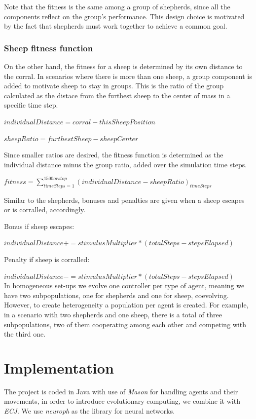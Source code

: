 \documentclass[conference]{IEEEtran}
\begin{document}
Note that the fitness is the same among a group of shepherds, since all the components reflect on the group's performance. This design choice is motivated by the fact that shepherds must work together to achieve a common goal. 

\subsubsection{Sheep fitness function}
On the other hand, the fitness for a sheep is determined by its own distance to the corral. In scenarios where there is more than one sheep, a group component is added to motivate sheep to stay in groups. This is the ratio of the group calculated as the distace from the furthest sheep to the center of mass in a specific time step. 

$\displaystyle individualDistance = corral - thisSheepPosition $

$\displaystyle sheepRatio = furthestSheep - sheepCenter $

Since smaller ratios are desired, the fitness function is determined as the individual distance minus the group ratio, added over the simulation time steps. 

$\displaystyle fitness = \sum_{timeSteps=1}^{1500 or stop}(individualDistance - sheepRatio)_{timeSteps}$

Similar to the shepherds, bonuses and penalties are given when a sheep escapes or is corralled, accordingly.  

Bonus if sheep escapes:

$\displaystyle individualDistance += stimulusMultiplier * (totalSteps - stepsElapsed)$

Penalty if sheep is corralled:

$\displaystyle individualDistance -= stimulusMultiplier * (totalSteps - stepsElapsed)$\\

In homogeneous set-ups we evolve one controller per type of agent, meaning we have two subpopulations, one for shepherds and one for sheep, coevolving. However, to create heterogeneity a population per agent is created. For example, in a scenario with two shepherds and one sheep, there is a total of three subpopulations, two of them cooperating among each other and competing with the third one.  


\section{Implementation}
The project is coded in Java with use of \textit{Mason} for handling agents and their movements, in order to introduce evolutionary computing, we combine it with \textit{ECJ}. We use \textit{neuroph} as the library for neural networks. 
\end{document}
